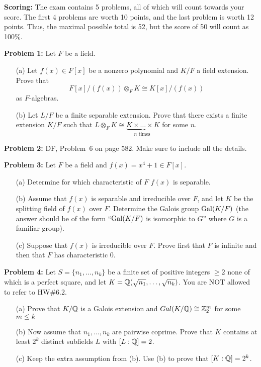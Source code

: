 \documentclass[12pt]{amsart}
\begin{document}
\skv
{\bf Scoring:} The exam contains 5 problems, all of which will count towards your score. The first 4 problems are worth 10 points, and the last problem
is worth 12 points. Thus, the maximal possible total is 52, but the score of 50 will count as 100\%.


\skv

{\bf Problem 1:} Let $F$ be a field.
\begin{itemize}
\item[(a)] Let $f(x)\in F[x]$ be a nonzero polynomial and $K/F$ a field extension.
Prove that $$F[x]/(f(x))\otimes_F K\cong K[x]/(f(x))$$ as $F$-algebras.
\item[(b)] Let $L/F$ be a finite separable extension. Prove that
there exists a finite extension $K/F$ such that 
$L\otimes_F K\cong \underbrace{K\times\ldots\times K}_{n \mbox{ times }}$
for some $n$.
\end{itemize}
\skv

{\bf Problem 2:} DF, Problem~6 on page 582. Make sure to include all the details.
\skv
\newpage

{\bf Problem 3:} Let $F$ be a field and $f(x)= x^4+ 1\in F[x]$.
\begin{itemize}
\item[(a)] Determine for which characteristic of $F$ $f(x)$ is separable.
\item[(b)]  Assume that $f(x)$ is separable and irreducible over $F$, and let $K$ be the splitting field of $f(x)$ over $F$.  
Determine the Galois group ${\rm Gal}(K/F)$ (the answer should be of the form ``${\rm Gal}(K/F)$ is isomorphic to $G$'' where $G$ is a familiar group).
\item[(c)] Suppose that $f(x)$ is irreducible over $F$. Prove first that $F$ is infinite and then that $F$ has characteristic $0$.
\end{itemize}

\skv
{\bf Problem 4:} \rm Let $S=\{n_1,\ldots, n_k\}$ be a finite set of positive integers $\geq 2$
none of which is a perfect square, and let $K={\mathbb Q}(\sqrt{n_1},\ldots, \sqrt{n_k})$. You are NOT allowed to refer to HW\#6.2.
\begin{itemize}
\item[(a)] Prove that $K/{\mathbb Q}$ is a Galois extension and $Gal(K/{\mathbb Q})\cong {\mathbb Z}_2^m$ for some $m\leq k$
\item[(b)] Now assume that $n_1,\ldots, n_k$ are pairwise coprime. Prove that $K$ contains at least $2^k$
distinct subfields $L$ with $[L:{\mathbb Q}]=2$. 
\item[(c)] Keep the extra assumption from (b). Use (b) to prove that $[K:{\mathbb Q}]=2^k$.  
\end{itemize}
\end{document}
